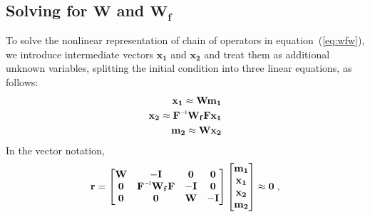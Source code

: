 \subsection*{Solving for $\mathbf{W} $ and $ \mathbf{W_f }$}
To solve the nonlinear representation of chain of operators in equation~(\ref{eq:wfw}), we introduce intermediate vectors $\mathbf{x_1}$ and $\mathbf{x_2}$ and treat them as additional unknown variables, splitting the initial condition into three linear equations, as follows:
\begin{equation}
\begin{split}
\mathbf{x_1 \approx Wm_{1}} \\
\mathbf{x_2 \approx \inv{F}W_{f}Fx_1}\\
\mathbf{m_{2} \approx Wx_2 } \\
\end{split}
\label{relax}
\end{equation}
In the vector notation,
\begin{equation}
\mathbf{r}= 
\begin{bmatrix}
\mathbf{W} & \mathbf{-I} & \mathbf{0} & \mathbf{0}\\
\mathbf{0} & \mathbf{\inv{F}W_{f}} \mathbf{F} & \mathbf{-I} & \mathbf{0}\\
\mathbf{0} & \mathbf{0} & \mathbf{W}  & \mathbf{-I}
\end{bmatrix}
\begin{bmatrix}
\mathbf{m_1} \\
\mathbf{x_1} \\
\mathbf{x_2} \\
\mathbf{m_2}
\end{bmatrix}
\approx \mathbf{0} \;,
\label{res_chain}
\end{equation}

